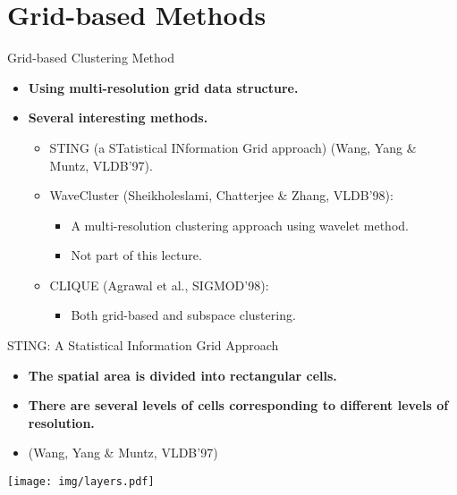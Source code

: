 \section{Grid-based Methods}

\begin{frame}{Grid-based Clustering Method}
	\begin{itemize}
		\item \textbf{Using multi-resolution grid data structure.}
		\item \textbf{Several interesting methods.}
		      \begin{itemize}
			      \item STING (a STatistical INformation Grid approach) (Wang, Yang
			            \& Muntz, VLDB'97).
			      \item WaveCluster (Sheikholeslami, Chatterjee \& Zhang, VLDB'98):
			            \begin{itemize}
				            \item A multi-resolution clustering approach using wavelet
				                  method.
				            \item Not part of this lecture.
			            \end{itemize}
			      \item CLIQUE (Agrawal et al., SIGMOD'98):
			            \begin{itemize}
				            \item Both grid-based and subspace clustering.
			            \end{itemize}
		      \end{itemize}
	\end{itemize}
\end{frame}

\begin{frame}{STING: A Statistical Information Grid Approach}
	\begin{itemize}
		\item \textbf{The spatial area is divided into rectangular cells.}
		\item \textbf{There are several levels of cells corresponding to
			      different levels of resolution.}
		\item (Wang, Yang \& Muntz, VLDB'97)
	\end{itemize}
	\vspace{0.5cm}
	\centering
	\texttt{[image: img/layers.pdf]}
\end{frame}

